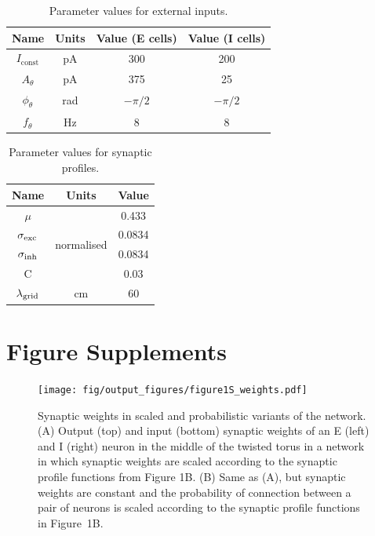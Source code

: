 \documentclass[a4paper,12pt]{article}
\newcommand{\ssc}[3]{\ensuremath{#1_{\text{#2}_{\text{#3}}}}}
\newcommand{\Iconst}   {\ssc{I}      {const} {}}
\newcommand{\Atheta}   {\ssc{A}      {$\theta$}{}}
\newcommand{\ftheta}   {\ssc{f}      {$\theta$}{}}
\newcommand{\phitheta} {\ssc{\phi}   {$\theta$}{}}
\newcommand{\sigmasub}[1]{\ssc{\sigma}{\scriptsize{#1}}{}}
\newcommand{\lamgrid}{\ssc{\lambda}{\scriptsize{grid}}{}}
\begin{document}
\begin{table}
    \internallinenumbers
    \centering
    \begin{tabular}{| c | c | c | c |}
        \hline
        Name       & Units & Value (E cells) & Value (I cells) \\
        \hline\hline
        $\Iconst$  & pA    & 300             & 200             \\
        $\Atheta$  & pA    & 375             & 25              \\
        $\phitheta$& rad   & $-\pi/2$        & $-\pi/2$        \\
        $\ftheta$  & Hz    & 8               & 8               \\
        \hline
    \end{tabular}
    \caption{Parameter values for external inputs.}
\end{table}

\begin{table}
    \internallinenumbers
    \centering
    \begin{tabular}{| c | c | c |}
        \hline
        Name              & Units                        & Value   \\
        \hline\hline
        $\mu$             & \multirow{4}{*}{normalised}  & 0.433   \\
        $\sigmasub{exc}$  &                              & 0.0834  \\
        $\sigmasub{inh}$  &                              & 0.0834  \\
        C                 &                              & 0.03    \\
        \lamgrid          & cm                           & 60      \\
        \hline
    \end{tabular}
    \caption{Parameter values for synaptic profiles.}
    \label{tab:params_syn}
\end{table}






\clearpage

\section*{Figure Supplements}

\setcounter{figure}{0}
\renewcommand{\figurename}{Figure 1 - figure supplement}

\begin{figure}[h!]
    \internallinenumbers
    \centering
        \texttt{[image: fig/output\_figures/figure1S\_weights.pdf]}
        \caption{Synaptic weights in scaled and probabilistic variants of the
        network. (A) Output (top) and input (bottom) synaptic weights of an E
        (left) and I (right) neuron in the middle of the twisted torus in a
        network in which synaptic weights are scaled according to the synaptic
        profile functions from Figure 1B. (B) Same as (A), but synaptic weights
        are constant and the probability of connection between a pair of
        neurons is scaled according to the synaptic profile functions in
        Figure~1B.}
\end{figure}
\end{document}
